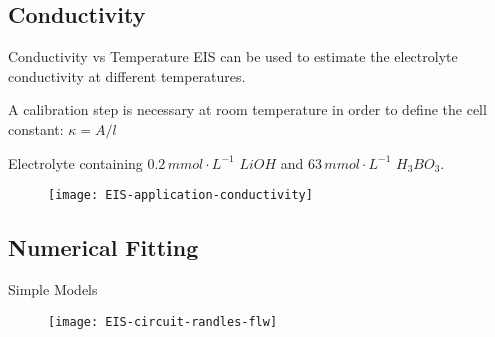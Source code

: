 \documentclass[10pt,compress,handout]{beamer}
\begin{document}
    \subsection{Conductivity}
    \begin{frame}{Conductivity vs Temperature}
        EIS can be used to estimate the electrolyte conductivity at different temperatures.

        A calibration step is necessary at room temperature in order 
        to define the cell constant: $\kappa = A/l$

        Electrolyte containing $0.2 \,mmol \cdot L^{-1}$ $LiOH$ and $63 \, mmol \cdot L^{-1}$ $H_3BO_3$.
        \begin{figure}
            \centering
            \texttt{[image: EIS-application-conductivity]}
        \end{figure}
    \end{frame}

    \subsection{Numerical Fitting}
    \begin{frame}{Simple Models}
        \begin{figure}
            \centering
            \texttt{[image: EIS-circuit-randles-flw]}
        \end{figure}
    \end{frame}
\end{document}
